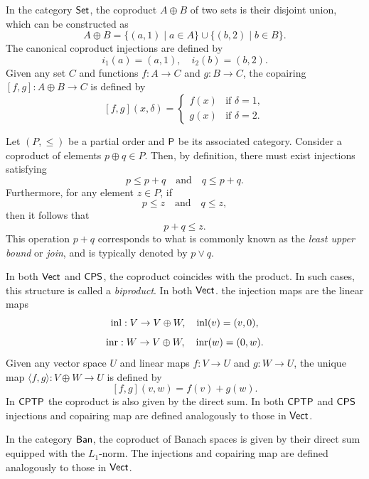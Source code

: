 \begin{example}
  In the category $\mathsf{Set}$, the coproduct \( A \oplus B \) of two sets is their disjoint union, which can be constructed as
\[
A \oplus B = \{(a, 1) \mid a \in A\} \cup \{(b, 2) \mid b \in B\}.
\]
The canonical coproduct injections are defined by
\[
i_1(a) = (a, 1), \quad i_2(b) = (b, 2).
\]
Given any set \(C\) and functions \(f: A \to C\) and \(g: B \to C\), the copairing \([f, g]: A \oplus B \to C\) is defined by
\[
[f, g](x, \delta) = 
\begin{cases}
f(x) & \text{if } \delta = 1, \\
g(x) & \text{if } \delta = 2.
\end{cases}
\]
\end{example}

\begin{example}
  Let $(P, \leq)$ be a partial order and $\mathsf{P}$ be its associated category.  
Consider a coproduct of elements \( p \oplus q \in P \). Then, by definition, there must exist injections satisfying
\[
p \leq p + q \quad \text{and} \quad q \leq p + q.
\]
Furthermore, for any element \( z \in P \), if
\[
p \leq z \quad \text{and} \quad q \leq z,
\]
then it follows that
\[
p + q \leq z.
\]
This operation \( p + q \) corresponds to what is commonly known as the \emph{least upper bound} or \emph{join}, and is typically denoted by \( p \vee q \).
\end{example}

\begin{example}
  In both  $\mathsf{Vect}$ and $\mathsf{CPS}$, the coproduct coincides with the product. In such cases, this structure is called a \emph{biproduct}. 
  In both  $\mathsf{Vect}$. the injection maps are the linear maps
\[
\mathrm{inl}: V \to  V \oplus W, \quad  \mathrm{inl}(v)= (v,0),
\]
\[
\mathrm{inr} : W \to V \oplus W, \quad \mathrm{inr}(w) = (0,w).
\]
Given any vector space $U$ and linear maps $f: V \to U$ and $g: W \to U$, the unique map $\langle f, g\rangle : V \oplus W \to U$
is defined by
\[
[f, g] (v,w) = f(v)+ g(w).
\]
In $\mathsf{CPTP}$ the coproduct is also given by the direct sum. In both $\mathsf{CPTP}$ and $\mathsf{CPS}$ injections and copairing map are defined analogously to those in \(\mathsf{Vect}\).
\end{example}

\begin{example}
  In the category \(\mathsf{Ban}\), the coproduct of Banach spaces is given by their direct sum equipped with the \(L_1\)-norm. The injections and copairing map are defined analogously to those in \(\mathsf{Vect}\). 
\end{example}

